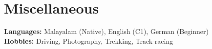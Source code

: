 \documentclass[a4paper,11pt]{article}
\newcommand{\resumeLeadership}[3]{
  \item
      \textbf{#1}\\#2 \\
      \textit{\small#3}\\

}
\begin{document}


\section{Miscellaneous}

\vspace{1mm}

\small{
	\textbf{Languages: }{Malayalam (Native), English (C1), German (Beginner)}\\
  \vspace{1mm}
 \vspace{1mm}
    \textbf{Hobbies: }{Driving, Photography, Trekking, Track-racing}\\
}
\end{document}

